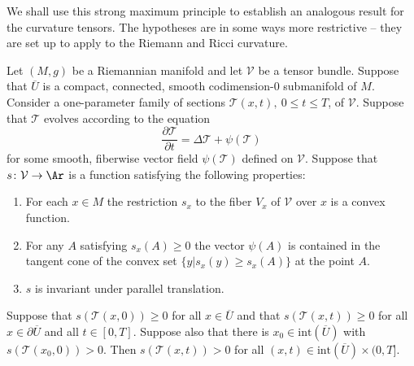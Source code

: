 We shall use this strong maximum principle to establish an analogous
result for the curvature tensors. The hypotheses are in some ways
more restrictive -- they are set up to apply to the Riemann and
Ricci curvature.

\begin{proposition}
\label{prop:strong-maximum-principle-curvature}
\label{SMPcurv}
Let $(M,g)$ be a Riemannian manifold and let ${\mathcal V}$ be a
tensor bundle. Suppose that $\overline U$ is a compact, connected,
smooth codimension-$0$ submanifold of $M$. Consider a one-parameter
family of sections ${\mathcal T}(x,t),\ 0\le t\le T$, of ${\mathcal
V}$. Suppose that ${\mathcal T}$ evolves according to the equation
$$\frac{\partial {\mathcal T}}{\partial t}=\Delta {\mathcal T}+\psi({\mathcal T})$$
for some smooth, fiberwise vector field $\psi({\mathcal T})$
defined on ${\mathcal V}$. Suppose that $s\colon {\mathcal V}\to
\Ar$ is a function satisfying the following properties:
\begin{enumerate}
\item For each $x\in M$ the restriction $s_x$ to the fiber $V_x$ of
${\mathcal V}$ over $x$ is a  convex function.
\item For any $A$ satisfying $s_x(A)\ge 0$ the vector $\psi(A)$ is contained
in the tangent cone of the convex set $\{y|s_x(y)\ge s_x(A)\}$ at the
point $A$.
\item $s$ is invariant under parallel translation.
\end{enumerate}
Suppose that $s({\mathcal T}(x,0))\ge 0$ for all $x\in \overline U$
and that $s({\mathcal T}(x,t))\ge 0$ for all $x\in \partial\overline
U$ and all $t\in [0,T]$. Suppose also that there is $x_0\in \mathrm{int}(\overline U)$ with $s({\mathcal T}(x_0,0))>0$. Then
$s({\mathcal T}(x,t))> 0$ for all $(x,t)\in \mathrm{int}(\overline
U)\times(0,T]$.
\end{proposition}


